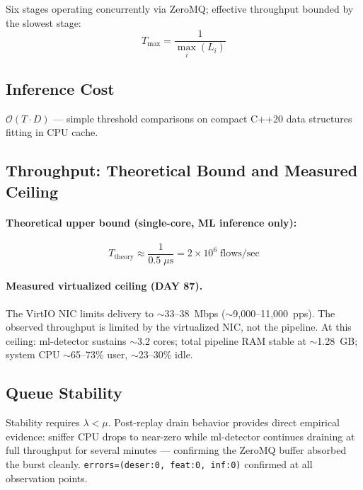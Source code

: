 \documentclass[11pt,a4paper]{article}
\begin{document}
    Six stages operating concurrently via ZeroMQ; effective throughput bounded by the slowest
    stage:
    \begin{equation}
        T_{\max} = \frac{1}{\max_i(L_i)}
    \end{equation}

    \subsection{Inference Cost}

    $\mathcal{O}(T \cdot D)$ --- simple threshold comparisons on compact C++20 data structures
    fitting in CPU cache.

    \subsection{Throughput: Theoretical Bound and Measured Ceiling}

    \paragraph{Theoretical upper bound (single-core, ML inference only):}
    \begin{equation}
        T_{\text{theory}} \approx \frac{1}{0.5\;\mu\text{s}} = 2 \times 10^6\;\text{flows/sec}
    \end{equation}

    \paragraph{Measured virtualized ceiling (DAY 87).}
    The VirtIO NIC limits delivery to ${\sim}$33--38~Mbps (${\sim}$9,000--11,000~pps).
    The observed throughput is limited by the virtualized NIC, not the pipeline.
    At this ceiling: ml-detector sustains ${\sim}$3.2 cores; total pipeline RAM stable at
    ${\sim}$1.28~GB; system CPU ${\sim}$65--73\% user, ${\sim}$23--30\% idle.

    \subsection{Queue Stability}

    Stability requires $\lambda < \mu$. Post-replay drain behavior provides direct empirical
    evidence: sniffer CPU drops to near-zero while ml-detector continues draining at full
    throughput for several minutes --- confirming the ZeroMQ buffer absorbed the burst cleanly.
    \texttt{errors=(deser:0, feat:0, inf:0)} confirmed at all observation points.
\end{document}
